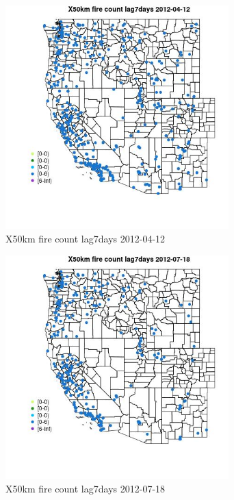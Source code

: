 \begin{figure} 
\centering  
\includegraphics[width=0.77\textwidth]{Code_Outputs/Report_ML_input_PM25_Step4_part_e_de_duplicated_aves_compiled_2019-05-14wNAs_MapObsX50km_fire_count_lag7days2012-04-12.jpg} 
\caption{\label{fig:Report_ML_input_PM25_Step4_part_e_de_duplicated_aves_compiled_2019-05-14wNAsMapObsX50km_fire_count_lag7days2012-04-12}X50km fire count lag7days 2012-04-12} 
\end{figure} 
 

\begin{figure} 
\centering  
\includegraphics[width=0.77\textwidth]{Code_Outputs/Report_ML_input_PM25_Step4_part_e_de_duplicated_aves_compiled_2019-05-14wNAs_MapObsX50km_fire_count_lag7days2012-07-18.jpg} 
\caption{\label{fig:Report_ML_input_PM25_Step4_part_e_de_duplicated_aves_compiled_2019-05-14wNAsMapObsX50km_fire_count_lag7days2012-07-18}X50km fire count lag7days 2012-07-18} 
\end{figure} 
 

